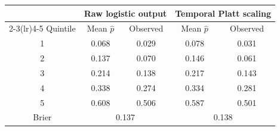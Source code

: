 \begin{tabular}{ccccc}
\toprule
 & \multicolumn{2}{c}{Raw logistic output} & \multicolumn{2}{c}{Temporal Platt scaling}\\
\cmidrule(lr){2-3}\cmidrule(lr){4-5}
Quintile & Mean $\hat p$ & Observed & Mean $\hat p$ & Observed\\
\midrule
1 & 0.068 & 0.029 & 0.078 & 0.031\\
2 & 0.137 & 0.070 & 0.146 & 0.061\\
3 & 0.214 & 0.138 & 0.217 & 0.143\\
4 & 0.338 & 0.274 & 0.334 & 0.281\\
5 & 0.608 & 0.506 & 0.587 & 0.501\\
\midrule
Brier & \multicolumn{2}{c}{0.137} & \multicolumn{2}{c}{0.138}\\
\bottomrule
\end{tabular}